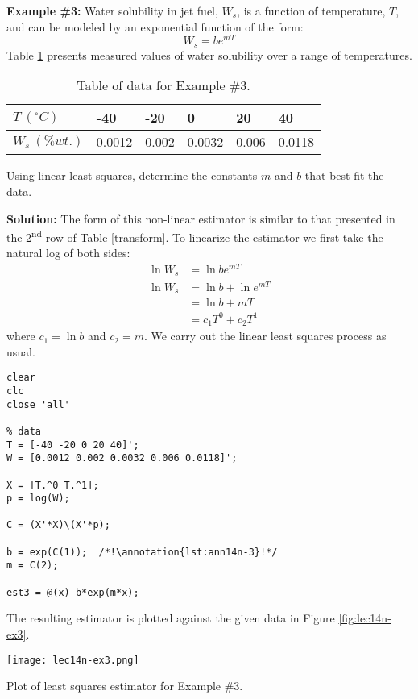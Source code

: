 \vspace{0.5cm}

\noindent \textbf{Example \#3:} Water solubility in jet fuel, $W_s$, is a function of temperature, $T$, and can be modeled by an exponential function of the form:
\begin{equation*}
W_s = be^{mT}
\end{equation*}
Table \ref{tab:lec14n-ex3} presents measured values of water solubility over a range of temperatures.  
\begin{table}
\begin{tabular}{|l|l|l|l|l|l|}
\hline
$T \ (^{\circ}C)$ & -40 & -20 & 0 & 20 & 40\\ \hline
$W_s \ (\% wt. )$ & 0.0012 & 0.002 & 0.0032 & 0.006 & 0.0118 \\ \hline 
\end{tabular}
\caption{Table of data for Example \#3.}
\label{tab:lec14n-ex3}
\end{table}

\vspace{0.1cm}

\noindent Using linear least squares, determine the constants $m$ and $b$ that best fit the data.

\vspace{0.2cm}


\noindent \textbf{Solution: }The form of this non-linear estimator is similar to that presented in the 2\textsuperscript{nd} row of Table \ref{transform}.  To linearize the estimator we first take the natural log of both sides:
\begin{align*}
\ln{W_s} &= \ln{be^{mT}} \\
\ln{W_s} &= \ln{b} + \ln{e^{mT}} \\
&= \ln{b} +  mT \\
&= c_1 T^{0} + c_2T^{1}
\end{align*}
where $c_1 = \ln{b}$ and $c_2 = m$.  We carry out the linear least squares process as usual.

\begin{lstlisting}[style=myMatlab]
clear
clc
close 'all'

% data
T = [-40 -20 0 20 40]';
W = [0.0012 0.002 0.0032 0.006 0.0118]';

X = [T.^0 T.^1];
p = log(W);

C = (X'*X)\(X'*p);

b = exp(C(1));  /*!\annotation{lst:ann14n-3}!*/
m = C(2);

est3 = @(x) b*exp(m*x);
\end{lstlisting}

\vspace{0.1cm}

\noindent The resulting estimator is plotted against the given data in Figure \ref{fig:lec14n-ex3}.

\begin{marginfigure}
\texttt{[image: lec14n-ex3.png]}
\caption{Plot of least squares estimator for Example \#3.}
\label{fig:lec14n-ex3}
\end{marginfigure}




